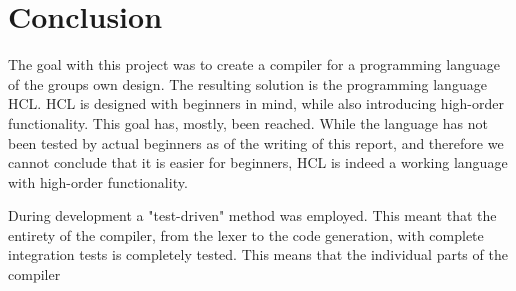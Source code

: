 \section{Conclusion}
The goal with this project was to create a compiler for a programming language of the groups own design.
The resulting solution is the programming language HCL.
HCL is designed with beginners in mind, while also introducing high-order functionality.
This goal has, mostly, been reached.
While the language has not been tested by actual beginners as of the writing of this report, and therefore we cannot conclude that it is easier for beginners, HCL is indeed a working language with high-order functionality.

During development a "test-driven" method was employed.
This meant that the entirety of the compiler, from the lexer to the code generation, with complete integration tests is completely tested.
This means that the individual parts of the compiler


